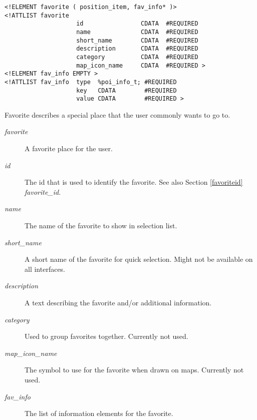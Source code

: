 \begin{verbatim}
<!ELEMENT favorite ( position_item, fav_info* )>
<!ATTLIST favorite
                    id                CDATA  #REQUIRED
                    name              CDATA  #REQUIRED
                    short_name        CDATA  #REQUIRED
                    description       CDATA  #REQUIRED
                    category          CDATA  #REQUIRED
                    map_icon_name     CDATA  #REQUIRED >
<!ELEMENT fav_info EMPTY >
<!ATTLIST fav_info  type  %poi_info_t; #REQUIRED
                    key   CDATA        #REQUIRED
                    value CDATA        #REQUIRED >
\end{verbatim}
\label{favorite}
Favorite describes a special place that the user commonly wants to
go to.
\begin{description}
\item[\emph{favorite}] A favorite place for the user.
\item[\emph{id}] The id that is used to identify the favorite. See also Section \ref{favoriteid} \emph{favorite\_id}.
\item[\emph{name}] The name of the favorite to show in selection list.
\item[\emph{short\_name}] A short name of the favorite for quick selection.
  Might not be available on all interfaces.
\item[\emph{description}] A text describing the favorite and/or additional
  information.
\item[\emph{category}] Used to group favorites together. Currently not used.
\item[\emph{map\_icon\_name}] The symbol to use for the favorite when drawn on
  maps. Currently not used.
\item[\emph{fav\_info}] The list of information elements for the favorite.
\end{description}
